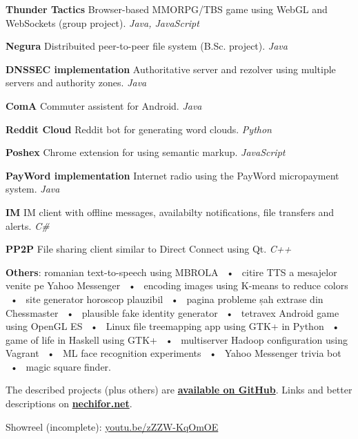 \documentclass[a4wide]{article}
\newcommand{\uses}[1]{\emph{\color[rgb]{0.35, 0.35, 0.35} #1}}
\newcommand{\sep}{~•~}
\begin{document}
\textbf{Thunder Tactics} Browser-based MMORPG/TBS game using WebGL and
WebSockets (group project). \uses{Java, JavaScript}

\textbf{Negura} Distribuited peer-to-peer file system (B.Sc. project).
\uses{Java}

\textbf{DNSSEC implementation} Authoritative server and rezolver using multiple
servers and authority zones. \uses{Java}

\textbf{ComA} Commuter assistent for Android. \uses{Java}

\textbf{Reddit Cloud} Reddit bot for generating word clouds. \uses{Python}

\textbf{Poshex} Chrome extension for using semantic markup. \uses{JavaScript}

\textbf{PayWord implementation} Internet radio using the PayWord micropayment
system. \uses{Java}

\textbf{IM} IM client with offline messages, availabilty notifications, file
transfers and alerts. \uses{C\#}

\textbf{PP2P} File sharing client similar to Direct Connect using Qt. \uses{C++}

\vspace{5mm}

\textbf{Others}: romanian text-to-speech using MBROLA
\sep{} citire TTS a mesajelor venite pe Yahoo Messenger
\sep{} encoding images using K-means to reduce colors
\sep{} site generator horoscop plauzibil
\sep{} pagina probleme șah extrase din Chessmaster
\sep{} plausible fake identity generator
\sep{} tetravex Android game using OpenGL ES
\sep{} Linux file treemapping app using GTK+ in Python
\sep{} game of life in Haskell using GTK+
\sep{} multiserver Hadoop configuration using Vagrant
\sep{} ML face recognition experiments
\sep{} Yahoo Messenger trivia bot
\sep{} magic square finder.

\vspace{5mm}

The described projects (plus others) are
\href{http://github.com/paul-nechifor}{\textbf{available on GitHub}}. Links and
better descriptions on \href{http://nechifor.net}{\textbf{nechifor.net}}.

\vspace{5mm}

Showreel (incomplete): \href{http://youtu.be/zZZW-KqOmOE}{youtu.be/zZZW-KqOmOE}
\end{document}
